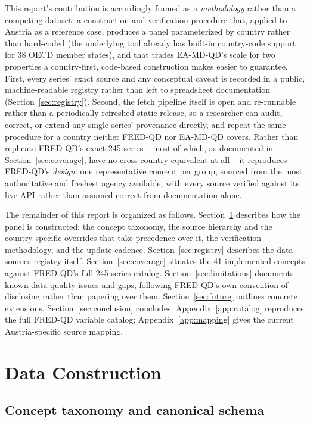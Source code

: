 \documentclass[11pt]{article}
\begin{document}
This report's contribution is accordingly framed as a \emph{methodology}
rather than a competing dataset: a construction and verification procedure
that, applied to Austria as a reference case, produces a panel
parameterized by country rather than hard-coded (the underlying tool
already has built-in country-code support for 38 OECD member states), and
that trades EA-MD-QD's scale for two properties a country-first, code-based
construction makes easier to guarantee. First, every series' exact source
and any conceptual caveat is recorded in a public, machine-readable
registry rather than left to spreadsheet documentation
(Section~\ref{sec:registry}). Second, the fetch pipeline itself is open and
re-runnable rather than a periodically-refreshed static release, so a
researcher can audit, correct, or extend any single series' provenance
directly, and repeat the same procedure for a country neither FRED-QD nor
EA-MD-QD covers. Rather than replicate FRED-QD's exact 245 series -- most
of which, as documented in Section~\ref{sec:coverage}, have no
cross-country equivalent at all -- it reproduces FRED-QD's \emph{design}:
one representative concept per group, sourced from the most authoritative
and freshest agency available, with every source verified against its live
API rather than assumed correct from documentation alone.

The remainder of this report is organized as follows. Section~\ref{sec:construction}
describes how the panel is constructed: the concept taxonomy, the source
hierarchy and the country-specific overrides that take precedence over it,
the verification methodology, and the update cadence. Section~\ref{sec:registry}
describes the data-sources registry itself. Section~\ref{sec:coverage}
situates the 41 implemented concepts against FRED-QD's full 245-series
catalog. Section~\ref{sec:limitations} documents known data-quality issues
and gaps, following FRED-QD's own convention of disclosing rather than
papering over them. Section~\ref{sec:future} outlines concrete extensions.
Section~\ref{sec:conclusion} concludes. Appendix~\ref{app:catalog} reproduces
the full FRED-QD variable catalog; Appendix~\ref{app:mapping} gives the
current Austria-specific source mapping.

\section{Data Construction}
\label{sec:construction}

\subsection{Concept taxonomy and canonical schema}
\end{document}
